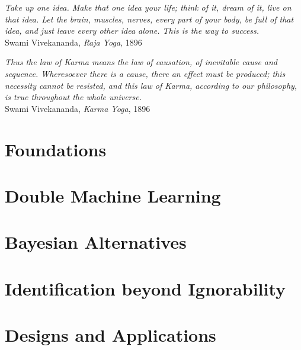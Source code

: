 \documentclass[10pt,openany,twoside]{book}
\makeatletter
\theoremstyle{definition}
\theoremstyle{remark}
\renewcommand\mainmatter{\clearpage\@mainmattertrue\pagenumbering{arabic}}
\makeatother
\begin{document}
\begin{flushright}
\begin{minipage}{3.6in}
\raggedleft
\emph{Take up one idea. Make that one idea your life; think of it, dream of it, live on that idea. Let the brain, muscles, nerves, every part of your body, be full of that idea, and just leave every other idea alone. This is the way to success.}\\[1ex]
Swami Vivekananda, \emph{Raja Yoga}, 1896
\end{minipage}

\vspace{0.6in}

\begin{minipage}{3.6in}
\raggedleft
\emph{Thus the law of Karma means the law of causation, of inevitable cause and sequence. Wheresoever there is a cause, there an effect must be produced; this necessity cannot be resisted, and this law of Karma, according to our philosophy, is true throughout the whole universe.}\\[1ex]
Swami Vivekananda, \emph{Karma Yoga}, 1896
\end{minipage}
\end{flushright}
\clearpage
\pagestyle{fancy}

\tableofcontents


\mainmatter

\part{Foundations}




\part{Double Machine Learning}



\part{Bayesian Alternatives}




\part{Identification beyond Ignorability}



\part{Designs and Applications}




\end{document}
